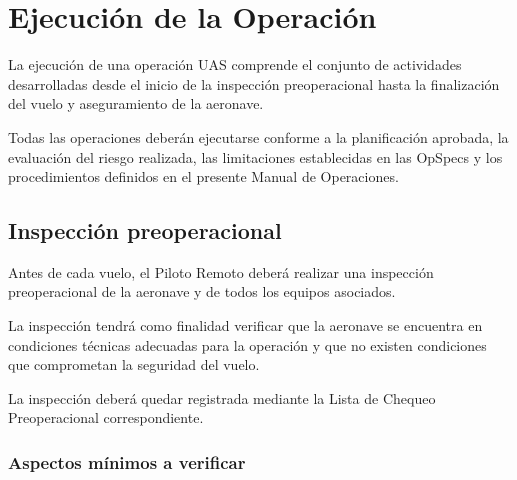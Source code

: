 \section{Ejecución de la Operación}

La ejecución de una operación UAS comprende el conjunto de actividades desarrolladas desde el inicio de la inspección preoperacional hasta la finalización del vuelo y aseguramiento de la aeronave.

Todas las operaciones deberán ejecutarse conforme a la planificación aprobada, la evaluación del riesgo realizada, las limitaciones establecidas en las OpSpecs y los procedimientos definidos en el presente Manual de Operaciones.









\subsection{Inspección preoperacional}

Antes de cada vuelo, el Piloto Remoto deberá realizar una inspección preoperacional de la aeronave y de todos los equipos asociados.

La inspección tendrá como finalidad verificar que la aeronave se encuentra en condiciones técnicas adecuadas para la operación y que no existen condiciones que comprometan la seguridad del vuelo.

La inspección deberá quedar registrada mediante la Lista de Chequeo Preoperacional correspondiente.


\subsubsection*{Aspectos mínimos a verificar}

